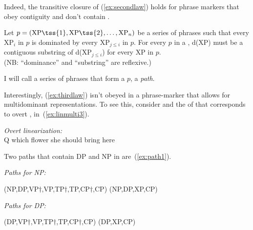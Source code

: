 \documentclass[output=paper]{langsci/langscibook}
\begin{document}
Indeed, the transitive closure of (\ref{ex:secondlaw}) holds for phrase markers that obey contiguity and don't contain .
\begin{exe}
	\ex \label{ex:thirdlaw}
	Let $p=(\text{XP\tss{1}}, \text{XP\tss{2}},\ldots,\text{XP}_n)$ be a series of phrases such that every XP$_i$ in $p$ is dominated by every XP$_{j \leq i}$ in $p$. For every $p$ in a , d(XP) must be a contiguous substring of d(XP$_{j \leq i}$) for every XP in $p$.\\[8pt]
	(NB: ``dominance'' and ``substring'' are reflexive.)
\end{exe}
I will call a series of phrases that form a $p$, a \emph{path}.

Interestingly, (\ref{ex:thirdlaw}) isn't obeyed in a phrase-marker that allows
for multidominant representations. To see this, consider  and
the  of  that corresponds to overt ,
in~(\ref{ex:linmulti3}).

%

\begin{exe}
	\ex \label{ex:linmulti3} \emph{Overt  linearization:}\\[3pt] Q which flower she should bring here
\end{exe}

Two paths that contain DP and NP in  are~(\ref{ex:path1}).

\begin{exe}
	\ex \label{ex:path1}
	\begin{xlist}
		\ex \emph{Paths for NP:}
		\begin{xlist}
		\ex \label{ex:bad1} (NP,DP,VP$\dag$,VP,TP$\dag$,TP,CP$\dag$,CP)
		\ex \label{ex:bad1b}(NP,DP,XP,CP)
		\end{xlist}
		\ex \emph{Paths for DP:}
		\begin{xlist}
			\ex \label{ex:bad2} (DP,VP$\dag$,VP,TP$\dag$,TP,CP$\dag$,CP)
			\ex \label{ex:bad2b}(DP,XP,CP)
		\end{xlist}
	\end{xlist}
\end{exe}
\end{document}

